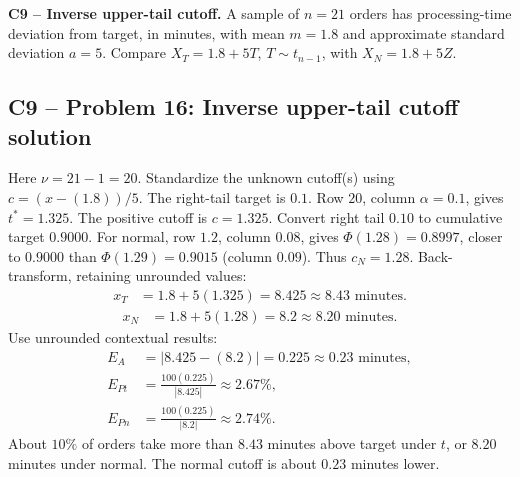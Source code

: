 {
\textbf{C9 -- Inverse upper-tail cutoff.} A sample of $n=21$ orders has processing-time deviation from target, in minutes, with mean $m=1.8$ and approximate standard deviation $a=5$. Compare $X_T=1.8+5T$, $T\sim t_{n-1}$, with $X_N=1.8+5Z$.
\label{sol:q16}
\subsection*{C9 -- Problem 16: Inverse upper-tail cutoff solution }
Here $\nu=21-1=20$. Standardize the unknown cutoff(s) using $c=(x-(1.8))/5$. The right-tail target is $0.1$.
Row $20$, column $\alpha=0.1$, gives $t^*=1.325$. 
The positive cutoff is $c=1.325$.
Convert right tail $0.10$ to cumulative target $0.9000$. For normal, row $1.2$, column $0.08$, gives $\Phi(1.28)=0.8997$, closer to $0.9000$ than $\Phi(1.29)=0.9015$ (column $0.09$). Thus $c_N=1.28$.
Back-transform, retaining unrounded values:
\[
\begin{aligned}
x_T&=1.8+5(1.325)=8.425\approx\boxed{8.43\text{ minutes}}.
\end{aligned}
\]
\[
\begin{aligned}
x_N&=1.8+5(1.28)=8.2\approx\boxed{8.20\text{ minutes}}.
\end{aligned}
\]
Use unrounded contextual results:
\[
\begin{aligned}
E_{A}&=|8.425-(8.2)|=0.225\approx\boxed{0.23\text{ minutes}},\\
E_{Pt}&=\frac{100(0.225)}{|8.425|}\approx\boxed{2.67\%},\\
E_{Pn}&=\frac{100(0.225)}{|8.2|}\approx\boxed{2.74\%}.
\end{aligned}
\]
About $10\%$ of orders take more than $8.43$ minutes above target under $t$, or $8.20$ minutes under normal. The normal cutoff is about $0.23$ minutes lower.
\secInicio[][sec:q16]
}

